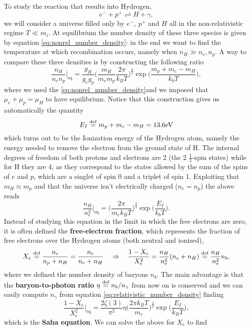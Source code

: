 To study the reaction that results into Hydrogen,
$$
e^-+p^+ \rightleftharpoons H+ \gamma,
$$
we will consider a universe filled only by $e^-,\ p^+$ and $H$ all in the non-relativistic regime $T\ll m_i$. At equilibrium the number density of these three species is given by equation \eqref{eq:nonrel_number_density}: in the end we want to find the temperature at which recombination occurs, namely when $n_H\gg n_e,n_p$. A way to compare these three densities is by constructing the following ratio
$$
\frac{n_H}{n_en_p}\bigg|_\text{eq}=\frac{g_H}{g_eg_p}\bigg(\frac{m_H}{m_em_p}\frac{2\pi}{k_BT}\bigg)^{\frac{3}{2}}\exp\bigg(\frac{m_p+m_e-m_H}{k_bT}\bigg),
$$
where we used the \eqref{eq:nonrel_number_density}and we imposed that $\mu_e+\mu_p=\mu_H$ to have equilibrium. Notice that this construction gives us automatically the quantity
$$
E_I\stackrel{\text{def}}{=} m_p+m_e-m_H=13.6\text{eV}
$$
which turns out to be the Ionization energy of the Hydrogen atom, namely the energy needed to remove the electron from the ground state of H. The internal degrees of freedom of both protons and electrons are 2 (the 2 $\tfrac12$-spin states) while for H they are 4, as they correspond to the states allowed by the sum of the spins of $e$ and $p$, which are a singlet of spin 0 and a triplet of spin 1.  Exploiting that $m_H\approx m_p$ and that the universe isn't electrically charged ($n_e=n_p$) the above reads
$$
\frac{n_H}{n_e^2}\bigg|_\text{eq}=\bigg(\frac{2\pi}{m_ek_BT}\bigg)^{\frac{3}{2}}\exp\bigg(\frac{E_I}{k_bT}\bigg).
$$
Instead of studying this equation in the limit in which the free electrons are zero, it is often defined the \textbf{free-electron fraction}, which represents the fraction of free electrons over the Hydrogen atoms (both neutral and ionized),
\begin{equation}
    X_e\stackrel{\text{def}}{=}\frac{n_e}{n_p+n_H}=\frac{n_e}{n_e+n_H}\quad\Rightarrow\quad \frac{1-X_e}{X_e^2}=\frac{n_H}{n^2_e}(n_e+n_H)\stackrel{\text{def}}{=}\frac{n_H}{n^2_e}n_b,
\end{equation}
where we defined the number density of baryons $n_b$. The main advantage is that the \textbf{baryon-to-photon ratio} $\eta\stackrel{\text{def}}{=} n_b/n_\gamma$ from now on is conserved and we can easily compute $n_\gamma$ from equation \eqref{eq:relativistic_number_density} finding
\begin{equation}
    \frac{1-X_e}{X_e^2}\bigg|_\text{eq}=\frac{2\zeta(3)}{\pi^2}\eta\bigg(\frac{2\pi k_BT}{m_e}\bigg)^{\frac{3}{2}}\exp\bigg({\frac{E_I}{k_BT}}\Bigg),\label{eq:Saha}
\end{equation}
which is the \textbf{Saha equation}. We can solve the above for $X_e$ to find
